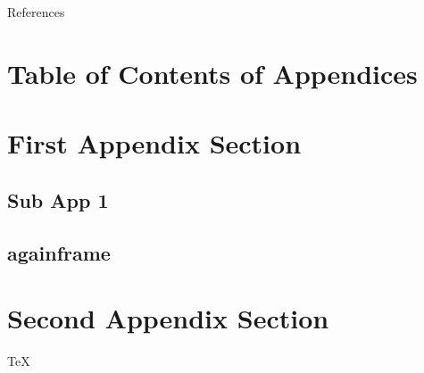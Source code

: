 \documentclass[9pt,xcolor=dvipsnames,dvipdfmx]{beamer}
\begin{document}
\begin{frame}{References}
    \renewcommand{\refname}{References}
    
\end{frame}


\beginbackup
\appendix

\section*{Table of Contents of Appendices}

\begin{frame}{\secname}
    \tableofcontents[hideallsubsections,firstsection=3]
\end{frame}

\section{First Appendix Section}
\subsection{Sub App 1}

\begin{frame}{\subsecname}
\end{frame}

\subsection{againframe}

\section{Second Appendix Section}
\begin{frame}{\secname}
    \TeX
\end{frame}

\backupend
\end{document}
